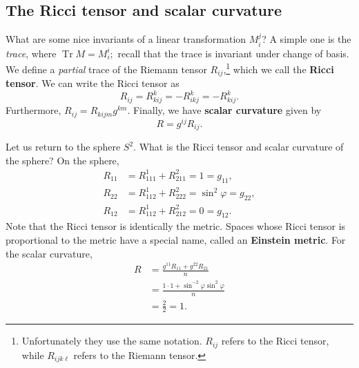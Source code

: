 \subsection{The Ricci tensor and scalar curvature}
What are some nice invariants of a linear transformation $M^j _i $? A simple one is the \emph{trace}, where $\operatorname{Tr}M=M^i _i;$ recall that the trace is invariant under change of basis. We define a \emph{partial} trace of the Riemann tensor $R_{ij}$,\footnote{Unfortunately they use the same notation. $R_{ij}$ refers to the Ricci tensor, while $R_{ijk\ell}$ refers to the Riemann tensor.} which we call the \textbf{Ricci tensor}. We can write the Ricci tensor as \[
R_{ij}=R_{kij}^k=-R_{ikj}^k=-R_{kij}^k.
\] Furthermore, $R_{ij}=R_{kijm}g^{km}$. Finally, we have \textbf{scalar curvature} given by \[
R=g^{ij}R_{ij}.
\] 
\begin{example}
    Let us return to the sphere $S^2$. What is the Ricci tensor and scalar curvature of the sphere? On the sphere, 
    \begin{align*}
        R_{11}&=R_{111}^1+R_{211}^2=1 =g_{11},\\
        R_{22}&=R_{112}^1+R_{222}^2=\sin ^2 \varphi =g_{22},\\
        R_{12}&=R_{112}^1+R_{212}^2=0=g_{12}.
    \end{align*} Note that the Ricci tensor is identically the metric. Spaces whose Ricci tensor is proportional to the metric have a special name, called an \textbf{Einstein metric}. For the scalar curvature, 
    \begin{align*}
        R&= \frac{g^{11}R_{11}+g^{22}R_{21}}{n}\\
         &=\frac{1\cdot 1+\sin ^{-2}\varphi  \sin ^2 \varphi }{n}\\
         &=\frac{2}{2}=1.
    \end{align*}
\end{example}
